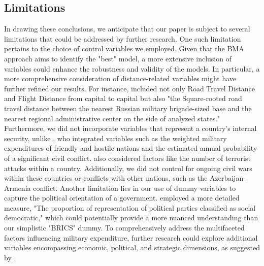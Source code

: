\documentclass[12pt,a4paper]{article}
\begin{document}
\subsection{Limitations}
In drawing these conclusions, we anticipate that our paper is subject to several limitations that could be addressed by further research. One such limitation pertains to the choice of control variables we employed. Given that the BMA approach aims to identify the "best" model, a more extensive inclusion of variables could enhance the robustness and validity of the models. In particular, a more comprehensive consideration of distance-related variables might have further refined our results. For instance, \citet{kofrovn2023} included not only Road Travel Distance and Flight Distance from capital to capital but also "the Square-rooted road travel distance between the nearest Russian military brigade-sized base and the nearest regional administrative center on the side of analyzed states." Furthermore, we did not incorporate variables that represent a country's internal security, unlike \citet{nordhaus2012}, who integrated variables such as the weighted military expenditures of friendly and hostile nations and the estimated annual probability of a significant civil conflict. \citet{kofrovn2023} also considered factors like the number of terrorist attacks within a country. Additionally, we did not control for ongoing civil wars within these countries or conflicts with other nations, such as the Azerbaijan-Armenia conflict. Another limitation lies in our use of dummy variables to capture the political orientation of a government. \citet{kofrovn2023} employed a more detailed measure, "The proportion of representation of political parties classified as social democratic," which could potentially provide a more nuanced understanding than our simplistic "BRICS" dummy. To comprehensively address the multifaceted factors influencing military expenditure, further research could explore additional variables encompassing economic, political, and strategic dimensions, as suggested by \citet{nikolaidou2008}.\\
\end{document}
